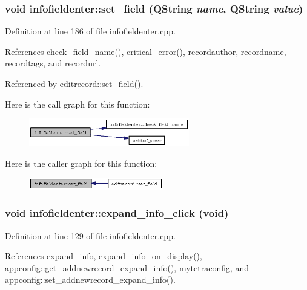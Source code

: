\subsubsection{\setlength{\rightskip}{0pt plus 5cm}void infofieldenter::set\_\-field (QString {\em name}, QString {\em value})}\label{classinfofieldenter_54f0af0d041c157e120c6d2521e25a8a}




Definition at line 186 of file infofieldenter.cpp.

References check\_\-field\_\-name(), critical\_\-error(), recordauthor, recordname, recordtags, and recordurl.

Referenced by editrecord::set\_\-field().

Here is the call graph for this function:\begin{figure}[H]
\begin{center}
\leavevmode
\includegraphics[width=198pt]{classinfofieldenter_54f0af0d041c157e120c6d2521e25a8a_cgraph}
\end{center}
\end{figure}


Here is the caller graph for this function:\begin{figure}[H]
\begin{center}
\leavevmode
\includegraphics[width=166pt]{classinfofieldenter_54f0af0d041c157e120c6d2521e25a8a_icgraph}
\end{center}
\end{figure}
\subsubsection{\setlength{\rightskip}{0pt plus 5cm}void infofieldenter::expand\_\-info\_\-click (void)\hspace{0.3cm}{\tt  [slot]}}\label{classinfofieldenter_ce685991cc56e7c4bc7f0a3ef51d06a0}




Definition at line 129 of file infofieldenter.cpp.

References expand\_\-info, expand\_\-info\_\-on\_\-display(), appconfig::get\_\-addnewrecord\_\-expand\_\-info(), mytetraconfig, and appconfig::set\_\-addnewrecord\_\-expand\_\-info().

